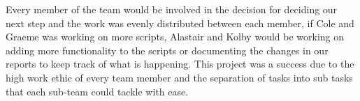 \documentclass[conference]{IEEEtran}
\begin{document}
Every member of the team would be involved in the decision for deciding our next step and the work was evenly distributed between each member, if Cole and Graeme was working on more scripts, Alastair and Kolby would be working on adding more functionality to the scripts or documenting the changes in our reports to keep track of what is happening. This project was a success due to the high work ethic of every team member and the separation of tasks into sub tasks that each sub-team could tackle with ease. 

\nocite{*}




\end{document}
